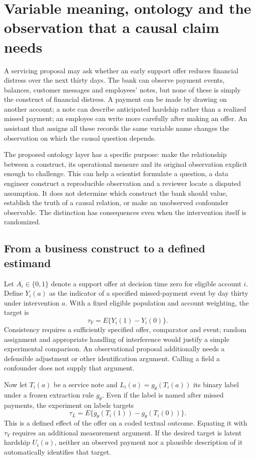 \chapter{Variable meaning, ontology and the observation that a causal claim needs}
\label{exec17:ontology}

A servicing proposal may ask whether an early support offer reduces financial
distress over the next thirty days. The bank can observe payment events,
balances, customer messages and employees' notes, but none of these is simply
the construct of financial distress. A payment can be made by drawing on
another account; a note can describe anticipated hardship rather than a
realized missed payment; an employee can write more carefully after making an
offer. An assistant that assigns all these records the same variable name
changes the observation on which the causal question depends.

The proposed ontology layer has a specific purpose: make the relationship
between a construct, its operational measure and its original observation
explicit enough to challenge. This can help a scientist formulate a question,
a data engineer construct a reproducible observation and a reviewer locate a
disputed assumption. It does not determine which construct the bank should
value, establish the truth of a causal relation, or make an unobserved
confounder observable. The distinction has consequences even when the
intervention itself is randomized.

\section{From a business construct to a defined estimand}

Let \(A_i\in\{0,1\}\) denote a support offer at decision time zero for eligible
account \(i\). Define \(Y_i(a)\) as the indicator of a specified missed-payment
event by day thirty under intervention \(a\). With a fixed eligible population
and account weighting, the target is
\[
 \tau_Y=E\{Y_i(1)-Y_i(0)\}.
\]
Consistency requires a sufficiently specified offer, comparator and event;
random assignment and appropriate handling of interference would justify a
simple experimental comparison. An observational proposal additionally needs
a defensible adjustment or other identification argument. Calling a field a
confounder does not supply that argument.

Now let \(T_i(a)\) be a service note and \(L_i(a)=g_\theta(T_i(a))\) its binary
label under a frozen extraction rule \(g_\theta\). Even if the label is named
after missed payments, the experiment on labels targets
\[
 \tau_L=E\{g_\theta(T_i(1))-g_\theta(T_i(0))\}.
\]
This is a defined effect of the offer on a coded textual outcome. Equating it
with \(\tau_Y\) requires an additional measurement argument. If the desired
target is latent hardship \(U_i(a)\), neither an observed payment nor a
plausible description of it automatically identifies that target.

